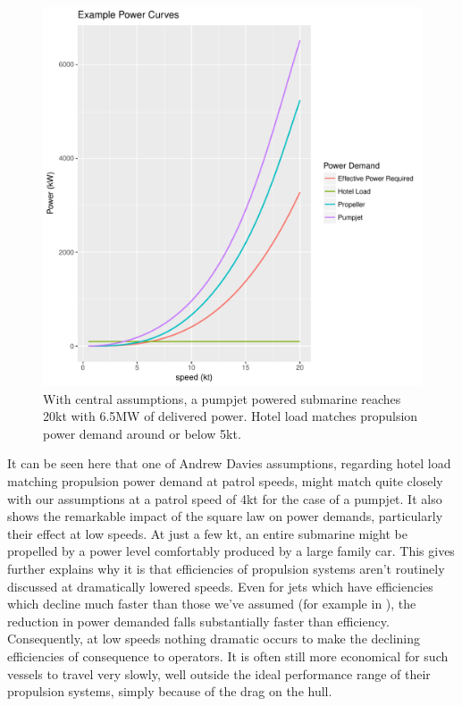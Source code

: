 \documentclass{article}\usepackage[]{graphicx}\usepackage[]{color}
\makeatletter
\def\maxwidth{ %
  \ifdim\Gin@nat@width>\linewidth
    \linewidth
  \else
    \Gin@nat@width
  \fi
}
\newenvironment{knitrout}{}{} %
\makeatother
\begin{document}
\begin{figure}
\begin{knitrout}
\color{fgcolor}

{\centering \includegraphics[width=\maxwidth]{figures/plots-plot_power1-1} 

}



\end{knitrout}
\caption{With central assumptions, a pumpjet powered submarine reaches 20kt with 6.5MW of delivered power.  Hotel load matches propulsion power demand around or below 5kt.}
\label{fig:power_curve}
\end{figure}

It can be seen here that one of Andrew Davies assumptions, regarding hotel load matching propulsion power demand at patrol speeds, might match quite closely with our assumptions at a patrol speed of 4kt for the case of a pumpjet.  It also shows the remarkable impact of the square law on power demands, particularly their effect at low speeds.  At just a few kt, an entire submarine might be propelled by a power level comfortably produced by a large family car.  This gives further explains why it is that efficiencies of propulsion systems aren't routinely discussed at dramatically lowered speeds. Even for jets which have efficiencies which decline much faster than those we've assumed (for example in \cite{fujisawa1995}), the reduction in power demanded falls substantially faster than efficiency.  Consequently, at low speeds nothing dramatic occurs to make the declining efficiencies of consequence to operators. It is often still more economical for such vessels to travel very slowly, well outside the ideal performance range of their propulsion systems, simply because of the drag on the hull.
\end{document}
